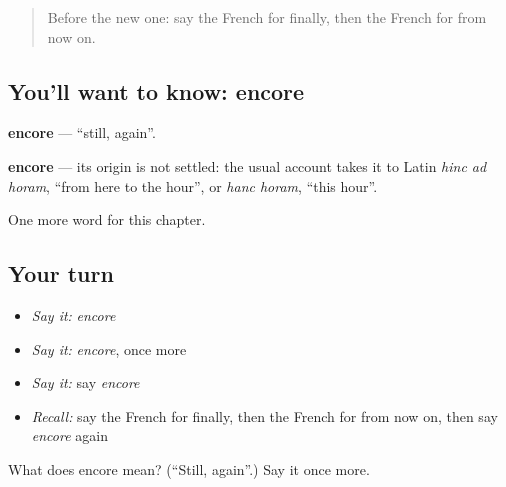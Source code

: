 \label{lesson:FR-C156-encore}



\begin{quote}
Before the new one: say the French for finally, then the French for from now on.
\end{quote}

\subsection*{You'll want to know: encore}
\textbf{encore} — \textquotedblleft{}still, again\textquotedblright{}.

\begin{cousinweb}
\textbf{encore} — its origin is not settled: the usual account takes it to Latin \emph{hinc ad horam}, \textquotedblleft{}from here to the hour\textquotedblright{}, or \emph{hanc horam}, \textquotedblleft{}this hour\textquotedblright{}.
\end{cousinweb}

\begin{grammarlens}[title={What you've built}]
One more word for this chapter.
\end{grammarlens}

\subsection*{Your turn}
\begin{itemize}
\raggedright
  \item \emph{Say it:} \emph{encore}
  \item \emph{Say it:} \emph{encore}, once more
  \item \emph{Say it:} say \emph{encore}
  \item \emph{Recall:} say the French for finally, then the French for from now on, then say \emph{encore} again
\end{itemize}

\begin{tcolorbox}[breakable,colback=teal!4,colframe=teal!35!black,title={Before you move on}]
What does encore mean? (\textquotedblleft{}Still, again\textquotedblright{}.) Say it once more.
\end{tcolorbox}
